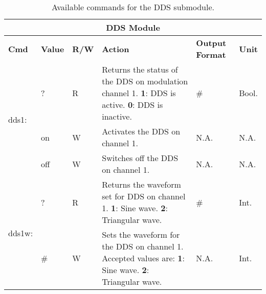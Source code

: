 \newpage





\begin{center}
    \begin{longtable}{| m{} | m{} | m{} | m{} | m{}| m{} |}
    \caption{Available commands for the DDS submodule.\label{\QubeModel _cmd_table_dds}}\\
    \hline
    \multicolumn{6}{|c|}{\textbf{DDS Module}} \\
    \hline \hline    
    \textbf{Cmd} & \textbf{Value} & \textbf{R/W} & \textbf{Action} & \textbf{Output \newline Format} & \textbf{Unit} \\
    \hline
    
    \multirow{3}{0.1\textwidth}{dds1:}  & ? & R & Returns the status of the DDS on modulation channel 1.
                                            \newline \textbf{1}: DDS is active.
                                            \newline \textbf{0}: DDS is inactive. &  \# & Bool. \\
                                        \cline{2-6}
                                        &  on  & W & Activates the DDS on channel 1. & N.A. & N.A.\\
                                        \cline{2-6}
                                        &  off  & W & Switches off the DDS on channel 1. & N.A. & N.A.\\
    \hline
    
    \multirow{2}{0.1\textwidth}{dds1w:}  & ? & R & Returns the waveform set for DDS on channel 1.
                                            \newline \textbf{1}: Sine wave.
                                            \newline \textbf{2}: Triangular wave.  &  \# & Int. \\
                                        \cline{2-6}
                                        &  \#  & W & Sets the waveform for the DDS on channel 1. Accepted values are:
                                            \newline \textbf{1}: Sine wave.
                                            \newline \textbf{2}: Triangular wave. & N.A. & Int.\\
    \hline
    

\end{longtable}
\end{center}
